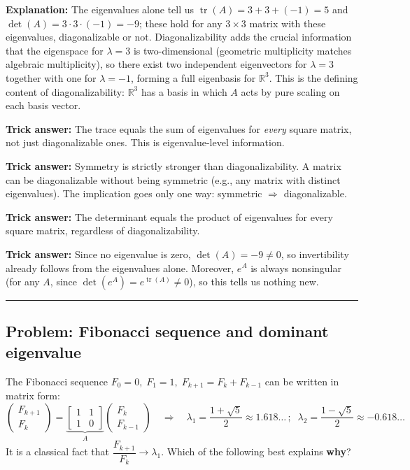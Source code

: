 \documentclass[12pt]{amsart}
\newcommand{\divider}{
  \vspace{-1em}
  \noindent
  \raisebox{-0.15ex}{\textbullet}%
  \hspace{0.5em}%
  \rule[0.5ex]{0.95\textwidth}{1.0pt}%
  \hspace{0.5em}%
  \raisebox{-0.15ex}{\textbullet}%
  \vspace{0em}
}
\begin{document}
\textbf{Explanation:}
The eigenvalues alone tell us $\operatorname{tr}(A) = 3 + 3 + (-1) = 5$
and $\det(A) = 3 \cdot 3 \cdot (-1) = -9$; these hold for any
$3 \times 3$ matrix with these eigenvalues, diagonalizable or not.
Diagonalizability adds the crucial information that the eigenspace for
$\lambda = 3$ is two-dimensional (geometric multiplicity matches
algebraic multiplicity), so there exist two independent eigenvectors
for $\lambda = 3$ together with one for $\lambda = -1$, forming a full
eigenbasis for $\mathbb{R}^3$. This is the defining content of
diagonalizability: $\mathbb{R}^3$ has a basis in which $A$ acts by pure
scaling on each basis vector.

\textbf{Trick answer:}
The trace equals the sum of eigenvalues for \emph{every} square matrix,
not just diagonalizable ones. This is eigenvalue-level information.

\textbf{Trick answer:}
Symmetry is strictly stronger than diagonalizability. A matrix can be
diagonalizable without being symmetric (e.g., any matrix with distinct
eigenvalues). The implication goes only one way:
symmetric $\Rightarrow$ diagonalizable.

\textbf{Trick answer:}
The determinant equals the product of eigenvalues for every square
matrix, regardless of diagonalizability.

\textbf{Trick answer:}
Since no eigenvalue is zero, $\det(A) = -9 \neq 0$, so invertibility
already follows from the eigenvalues alone. Moreover, $e^A$ is always
nonsingular (for any $A$, since
$\det(e^A) = e^{\operatorname{tr}(A)} \neq 0$), so this tells us nothing
new.

\divider

\subsection*{Problem: Fibonacci sequence and dominant eigenvalue}

The Fibonacci sequence $F_0 = 0,\; F_1 = 1,\; F_{k+1} = F_k + F_{k-1}$
can be written in matrix form:
$$\begin{pmatrix} F_{k+1} \\ F_k \end{pmatrix}
  = \underbrace{\begin{bmatrix} 1 & 1 \\ 1 & 0 \end{bmatrix}}_{A}
    \begin{pmatrix} F_k \\ F_{k-1} \end{pmatrix}
\quad \Rightarrow \quad
\lambda_1 = \dfrac{1+\sqrt{5}}{2} \approx 1.618\ldots\,;\;\;
\lambda_2 = \dfrac{1-\sqrt{5}}{2} \approx -0.618\ldots$$
It is a classical fact that $\dfrac{F_{k+1}}{F_k} \to \lambda_1$.
Which of the following best explains \textbf{why}?
\end{document}
